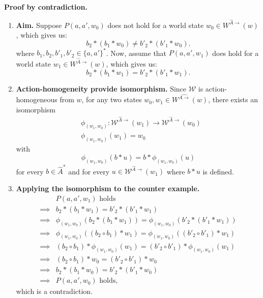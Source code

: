 \begin{proofE}
\textbf{Proof by contradiction.}
\begin{enumerate}[(1)]
    \item \textbf{Aim.}
    Suppose $P(a, a', w_{0})$ does not hold for a world state $w_{0} \in W^{\hat{A}\to}(w)$, which gives us:
    \begin{equation}
        b_{2} \ast (b_{1} \ast w_{0}) \neq b'_{2} \ast (b'_{1} \ast w_{0}).
    \end{equation}
    where $b_{1}, b_{2}, b'_{1}, b'_{2} \in \{a, a'\}^{*}$.
    Now, assume that $P(a, a', w_{1})$ does hold for a world state $w_{1} \in W^{\hat{A}\to}(w)$, which gives us:
    \begin{equation}
        b_{2} \ast (b_{1} \ast w_{1}) = b'_{2} \ast (b'_{1} \ast w_{1}).
    \end{equation}
    
    \item \textbf{Action-homogeneity provide isomorphism.}
    Since $\mathscr{W}$ is action-homogeneous from $w$, for any two states $w_{0}, w_{1} \in W^{\hat{A\to}}(w)$, there exists an isomorphism
    \begin{align}
        & \phi_{(w_{1}, w_{0})}: \mathscr{W}^{\hat{A}\to}(w_{1}) \to \mathscr{W}^{\hat{A}\to}(w_{0}) \\
        & \phi_{(w_{1}, w_{0})}(w_{1}) = w_{0}
    \end{align}
    with
    \begin{equation}
        \phi_{(w_{1}, w_{0})}(b \ast u) = b \ast \phi_{(w_{1}, w_{0})}(u)
    \end{equation}
    for every $b \in \hat{A}^{*}$ and for every $u \in \mathscr{W}^{\hat{A}\to}(w_{1})$ where $b \ast u$ is defined.

    \item \textbf{Applying the isomorphism to the counter example.}
    \begin{align}
        & P(a, a', w_{1}) \text{ holds}  \\
        \implies & b_{2} \ast (b_{1} \ast w_{1}) = b'_{2} \ast (b'_{1} \ast w_{1}) \\
        \implies & \phi_{(w_{1}, w_{0})}(b_{2} \ast (b_{1} \ast w_{1})) = \phi_{(w_{1}, w_{0})}(b'_{2} \ast (b'_{1} \ast w_{1})) \\
        \implies & \phi_{(w_{1}, w_{0})}((b_{2} \circ b_{1}) \ast w_{1}) = \phi_{(w_{1}, w_{0})}((b'_{2} \circ b'_{1}) \ast w_{1}) \\
        \implies & (b_{2} \circ b_{1}) \ast \phi_{(w_{1}, w_{0})}(w_{1}) = (b'_{2} \circ b'_{1}) \ast \phi_{(w_{1}, w_{0})}(w_{1}) \\
        \implies & (b_{2} \circ b_{1}) \ast w_{0} = (b'_{2} \circ b'_{1}) \ast w_{0} \\
        \implies & b_{2} \ast (b_{1} \ast w_{0}) = b'_{2} \ast (b'_{1} \ast w_{0}) \\
        \implies & P(a, a', w_{0}) \text{ holds},
    \end{align}
    which is a contradiction.
\end{enumerate}
\end{proofE}



